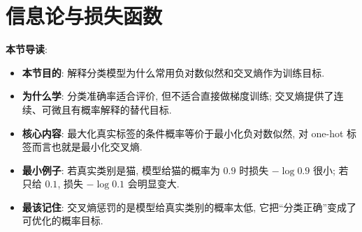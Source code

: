 \documentclass{../nndlcourse}
\begin{document}
\section{信息论与损失函数}
\textbf{本节导读}:
\begin{itemize}
    \item \textbf{本节目的}: 解释分类模型为什么常用负对数似然和交叉熵作为训练目标.
    \item \textbf{为什么学}: 分类准确率适合评价, 但不适合直接做梯度训练; 交叉熵提供了连续、可微且有概率解释的替代目标.
    \item \textbf{核心内容}: 最大化真实标签的条件概率等价于最小化负对数似然, 对 one-hot 标签而言也就是最小化交叉熵.
    \item \textbf{最小例子}: 若真实类别是猫, 模型给猫的概率为 $0.9$ 时损失 $-\log 0.9$ 很小; 若只给 $0.1$, 损失 $-\log 0.1$ 会明显变大.
    \item \textbf{最该记住}: 交叉熵惩罚的是模型给真实类别的概率太低, 它把“分类正确”变成了可优化的概率目标.
\end{itemize}
\end{document}

